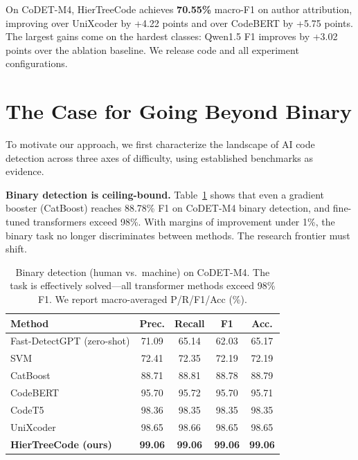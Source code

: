 \documentclass{article}
\begin{document}
On CoDET-M4, HierTreeCode achieves \textbf{70.55\%} macro-F1 on author attribution, improving over UniXcoder by +4.22 points and over CodeBERT by +5.75 points. The largest gains come on the hardest classes: Qwen1.5 F1 improves by +3.02 points over the ablation baseline. We release code and all experiment configurations.


\section{The Case for Going Beyond Binary}
\label{sec:beyond_binary}

To motivate our approach, we first characterize the landscape of AI code detection across three axes of difficulty, using established benchmarks as evidence.

\textbf{Binary detection is ceiling-bound.} Table~\ref{tab:binary_ceiling} shows that even a gradient booster (CatBoost) reaches 88.78\% F1 on CoDET-M4 binary detection, and fine-tuned transformers exceed 98\%. With margins of improvement under 1\%, the binary task no longer discriminates between methods. The research frontier must shift.

\begin{table}[t]
\caption{Binary detection (human vs.\ machine) on CoDET-M4. The task is effectively solved---all transformer methods exceed 98\% F1. We report macro-averaged P/R/F1/Acc (\%).}
\label{tab:binary_ceiling}
\centering
\small
\begin{tabular}{lcccc}
\toprule
\textbf{Method} & \textbf{Prec.} & \textbf{Recall} & \textbf{F1} & \textbf{Acc.} \\
\midrule
Fast-DetectGPT {\scriptsize (zero-shot)} & 71.09 & 65.14 & 62.03 & 65.17 \\
SVM & 72.41 & 72.35 & 72.19 & 72.19 \\
CatBoost & 88.71 & 88.81 & 88.78 & 88.79 \\
CodeBERT & 95.70 & 95.72 & 95.70 & 95.71 \\
CodeT5 & 98.36 & 98.35 & 98.35 & 98.35 \\
UniXcoder & 98.65 & 98.66 & 98.65 & 98.65 \\
\midrule
\rowcolor{ours}
\textbf{HierTreeCode (ours)} & \textbf{99.06} & \textbf{99.06} & \textbf{99.06} & \textbf{99.06} \\
\bottomrule
\end{tabular}
\end{table}
\end{document}
